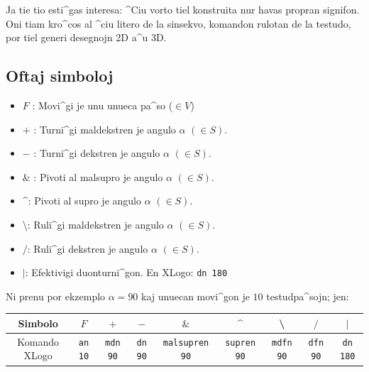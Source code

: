 Ja tie tio esti^gas interesa: ^Ciu vorto tiel konstruita nur havas
propran signifon.  Oni tiam kro^cos al ^ciu litero de la sinsekvo,
komandon rulotan de la testudo, por tiel generi desegnojn 2D a^u 3D.

\subsection{Oftaj simboloj}
\begin{itemize}
 \item [\textbullet] $F$ : Movi^gi je unu unueca pa^so ($\in V$)
 \item [\textbullet] $+$ : Turni^gi maldekstren je angulo $\alpha$ $(\in S)$.
 \item [\textbullet] $-$ : Turni^gi dekstren je angulo $\alpha$ $(\in S)$.
 \item [\textbullet] $\&$ : Pivoti al malsupro je angulo $\alpha$ $(\in S)$.
 \item [\textbullet] \textasciicircum : Pivoti al supro je angulo $\alpha$ $(\in S)$.
 \item [\textbullet] \textbackslash: Ruli^gi maldekstren je angulo $\alpha$ $(\in S)$.
 \item [\textbullet] $/$: Ruli^gi dekstren je angulo $\alpha$ $(\in S)$.
 \item [\textbullet] $|$: Efektivigi duonturni^gon.  En XLogo: \texttt{dn 180}
\end{itemize}
\vspace*{0.2cm}
Ni prenu por ekzemplo $\alpha=90$ kaj unuecan movi^gon je $10$ testudpa^sojn; jen:
\begin{center}
 \begin{tabular}{|c|c|c|c|c|c|c|c|c|}
 \hline
Simbolo & $F$ & $+$ & $-$ & $\&$ & \textasciicircum & \textbackslash& $/$ & $|$ \\
 \hline
Komando XLogo & \texttt{an 10}&\texttt{mdn 90}&\texttt{dn 90}&\texttt{malsupren 90}&\texttt{supren 90}&\texttt{mdfn 90}&\texttt{dfn 90}&\texttt{dn 180}\\
 \hline
\end{tabular}
\end{center}
